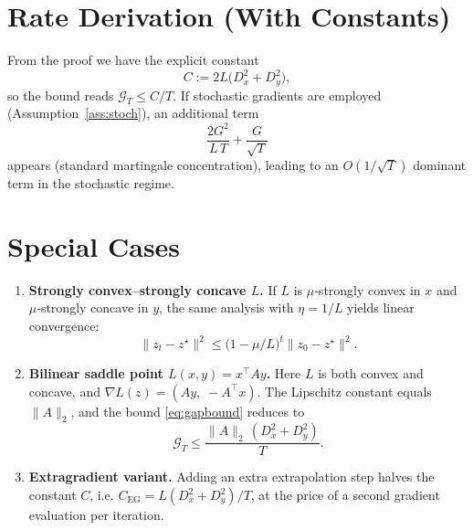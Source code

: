 \documentclass{article}
\begin{document}
\section*{Rate Derivation (With Constants)}
From the proof we have the explicit constant
\[
C := 2L\bigl(D_x^2 + D_y^2\bigr),
\]
so the bound reads $\mathcal{G}_T \le C/T$.  If stochastic gradients are employed (Assumption~\ref{ass:stoch}), an additional term
\[
\frac{2G^2}{L\,T} + \frac{G}{\sqrt{T}}
\]
appears (standard martingale concentration), leading to an $O(1/\sqrt{T})$ dominant term in the stochastic regime.

\section*{Special Cases}
\begin{enumerate}[label=\alph*.]
\item \textbf{Strongly convex–strongly concave $L$.}  
If $L$ is $\mu$‑strongly convex in $x$ and $\mu$‑strongly concave in $y$, the same analysis with $\eta=1/L$ yields linear convergence:
\[
\|z_t-z^\star\|^2 \le \bigl(1-\mu/L\bigr)^t \|z_0-z^\star\|^2 .
\]

\item \textbf{Bilinear saddle point $L(x,y)=x^\top Ay$.}  
Here $L$ is both convex and concave, and $\nabla L(z)= (Ay,\; -A^\top x)$.  The Lipschitz constant equals $\|A\|_2$, and the bound \eqref{eq:gapbound} reduces to
\[
\mathcal{G}_T \le \frac{\|A\|_2\,(D_x^2+D_y^2)}{T}.
\]

\item \textbf{Extragradient variant.}  
Adding an extra extrapolation step halves the constant $C$, i.e. $C_{\text{EG}} = L(D_x^2+D_y^2)/T$, at the price of a second gradient evaluation per iteration.
\end{enumerate}
\end{document}
